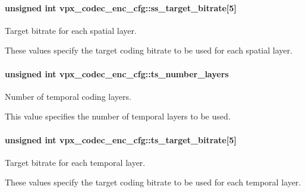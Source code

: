 \paragraph[{\texorpdfstring{ss\+\_\+target\+\_\+bitrate}{ss_target_bitrate}}]{\setlength{\rightskip}{0pt plus 5cm}unsigned int vpx\+\_\+codec\+\_\+enc\+\_\+cfg\+::ss\+\_\+target\+\_\+bitrate\mbox{[}5\mbox{]}}\hypertarget{structvpx__codec__enc__cfg_a5ff2f5884109736d0c2464bc156fda1f}{}\label{structvpx__codec__enc__cfg_a5ff2f5884109736d0c2464bc156fda1f}


Target bitrate for each spatial layer. 

These values specify the target coding bitrate to be used for each spatial layer. 
\paragraph[{\texorpdfstring{ts\+\_\+number\+\_\+layers}{ts_number_layers}}]{\setlength{\rightskip}{0pt plus 5cm}unsigned int vpx\+\_\+codec\+\_\+enc\+\_\+cfg\+::ts\+\_\+number\+\_\+layers}\hypertarget{structvpx__codec__enc__cfg_a16d4549a30cbd585e3c3056ef873d8c7}{}\label{structvpx__codec__enc__cfg_a16d4549a30cbd585e3c3056ef873d8c7}


Number of temporal coding layers. 

This value specifies the number of temporal layers to be used. 
\paragraph[{\texorpdfstring{ts\+\_\+target\+\_\+bitrate}{ts_target_bitrate}}]{\setlength{\rightskip}{0pt plus 5cm}unsigned int vpx\+\_\+codec\+\_\+enc\+\_\+cfg\+::ts\+\_\+target\+\_\+bitrate\mbox{[}5\mbox{]}}\hypertarget{structvpx__codec__enc__cfg_aba7ceb7a90500a8f76aff89575737f3a}{}\label{structvpx__codec__enc__cfg_aba7ceb7a90500a8f76aff89575737f3a}


Target bitrate for each temporal layer. 

These values specify the target coding bitrate to be used for each temporal layer. 
